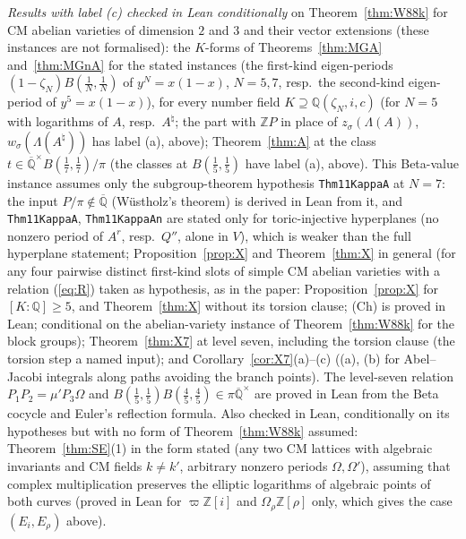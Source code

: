 \documentclass[11pt]{amsart}
\theoremstyle{definition}
\newcommand{\Qb}{\overline{\mathbb{Q}}}
\newcommand{\Q}{\mathbb{Q}}
\newcommand{\Z}{\mathbb{Z}}
\newcommand{\vp}{\varpi}
\begin{document}
\emph{Results with label (c) checked in Lean conditionally} on Theorem~\ref{thm:W88k} for CM abelian varieties of dimension
$2$ and $3$ and their vector extensions (these instances are not formalised): the $K$-forms of Theorems~\ref{thm:MGA}
and~\ref{thm:MGnA} for the stated instances (the first-kind eigen-periods $(1-\zeta_N)B(\frac1N,\frac1N)$ of
$y^N=x(1-x)$, $N=5,7$, resp.\ the second-kind eigen-period of $y^5=x(1-x)$), for every number field $K\supseteq\Q(\zeta_N,i,c)$
(for $N=5$ with logarithms of $A$, resp.\ $A^\natural$; the part with $\Z P$ in place of $z_\sigma(\Lambda(A))$,
$w_\sigma(\Lambda(A^\natural))$ has label (a), above);
Theorem~\ref{thm:A} at the class $t\in\Qb^\times B(\frac17,\frac17)/\pi$ (the classes at $B(\frac15,\frac15)$ have label (a),
above). This Beta-value instance assumes only the subgroup-theorem hypothesis \texttt{Thm11KappaA} at $N=7$: the input
$P/\pi\notin\Qb$ (W\"ustholz's theorem) is derived in Lean from it, and \texttt{Thm11KappaA}, \texttt{Thm11KappaAn} are stated
only for toric-injective hyperplanes (no nonzero period of $A^r$, resp.\ $Q''$, alone in $V$), which is weaker than the full
hyperplane statement;
Proposition~\ref{prop:X} and Theorem~\ref{thm:X} in general (for any four pairwise distinct first-kind slots of simple CM
abelian varieties with a relation (\ref{eq:R}) taken as hypothesis, as in the paper: Proposition~\ref{prop:X} for
$[K:\Q]\ge5$, and Theorem~\ref{thm:X} without its torsion clause; (Ch) is proved in Lean; conditional on the
abelian-variety instance of Theorem~\ref{thm:W88k} for the block groups); Theorem~\ref{thm:X7} at level seven, including
the torsion clause (the torsion step a named input); and Corollary~\ref{cor:X7}(a)--(c) ((a), (b) for Abel--Jacobi integrals
along paths avoiding the branch points). The level-seven relation $P_1P_2=\mu'P_3\Omega$ and
$B(\frac15,\frac15)B(\frac45,\frac45)\in\pi\Qb^\times$ are proved in Lean from the Beta cocycle and Euler's reflection formula.
Also checked in Lean, conditionally on its hypotheses but with no form of Theorem~\ref{thm:W88k} assumed:
Theorem~\ref{thm:SE}(1) in the form stated (any two CM lattices with algebraic invariants and CM fields $k\neq k'$,
arbitrary nonzero periods $\Omega,\Omega'$), assuming that complex multiplication preserves the elliptic logarithms of
algebraic points of both curves (proved in Lean for $\vp\Z[i]$ and $\Omega_\rho\Z[\rho]$ only, which gives the case
$(E_i,E_\rho)$ above).
\end{document}
